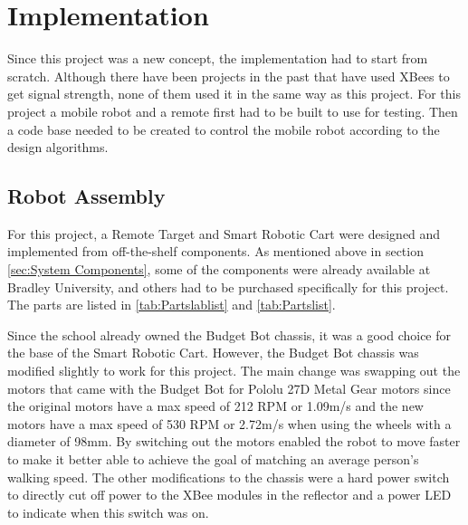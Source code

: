 \chapter{Implementation}
\label{ch: implementation}

Since this project was a new concept, the implementation had to start from scratch. Although there have been projects in the past that have used XBees to get signal strength, none of them used it in the same way as this project. For this project a mobile robot and a remote first had to be built to use for testing. Then a code base needed to be created to control the mobile robot according to the design algorithms.

\section{Robot Assembly}
\label{sec:Robot Assembly}

For this project, a Remote Target and Smart Robotic Cart were designed and implemented from off-the-shelf components.  As mentioned above in section \ref{sec:System Components}, some of the components were already available at Bradley University, and others had to be purchased specifically for this project. The parts are listed in \autoref{tab:Partslablist} and \autoref{tab:Partslist}.

\vspace*{12pt}
\noindent
Since the school already owned the Budget Bot chassis, it was a good choice for the base of the  Smart Robotic Cart. However, the Budget Bot chassis was modified slightly to work for this project. The main change was swapping out the motors that came with the Budget Bot for Pololu 27D Metal Gear motors since the original motors have a max speed of 212 RPM or 1.09m/s and the new motors have a max speed of 530 RPM or 2.72m/s when using the wheels with a diameter of 98mm. By switching out the motors enabled the robot to move faster to make it better able to achieve the goal of matching an average person's walking speed. The other modifications to the chassis were a hard power switch to directly cut off power to the XBee modules in the reflector and a power LED to indicate when this switch was on.

